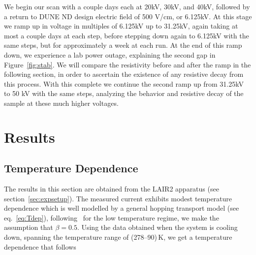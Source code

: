 \documentclass[a4paper,12pt]{article}
\begin{document}
We begin our scan with a couple days each at 20kV, 30kV, and 40kV, followed by a return to DUNE ND design electric field of 500 V/cm, or 6.125kV. At this stage we ramp up in voltage in multiples of 6.125kV up to 31.25kV, again taking at most a couple days at each step, before stepping down again to 6.125kV with the same steps, but for approximately a week at each run.
At the end of this ramp down, we experience a lab power outage, explaining the second gap in Figure~\ref{fig:stab}. We will compare the resistivity before and after the ramp in the following section, in order to ascertain the existence of any resistive decay from this process. With this complete we continue the second ramp up from 31.25kV to 50 kV with the same steps, analyzing the behavior and resistive decay of the sample at these much higher voltages.



\section{Results}
\label{sec:res}
\subsection{Temperature Dependence}
\label{sec:TNEFit}
The results in this section are obtained from the LAIR2 apparatus (see section~\ref{sec:expsetup}). The measured current exhibits modest temperature dependence which is well modelled by a general hopping transport model (see eq.~\ref{eq:Tdep}), following~\cite{electronicPhotonicMaterials} for the low temperature regime, we make the assumption that $\beta=0.5$. Using the data obtained when the system is cooling down, spanning the temperature range of (278--90)\,K, we get a temperature dependence that follows

% 
\end{document}
